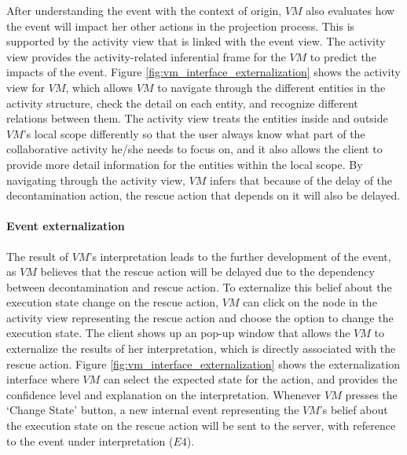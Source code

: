 After understanding the event with the context of origin, $VM$ also evaluates how the event will impact her other actions in the projection process. This is supported by the activity view that is linked with the event view. The activity view provides the activity-related inferential frame for the $VM$ to predict the impacts of the event. Figure \ref{fig:vm_interface_externalization} shows the activity view for $VM$, which allows $VM$ to navigate through the different entities in the activity structure, check the detail on each entity, and recognize different relations between them. The activity view treats the entities inside and outside $VM$'s local scope differently so that the user always know what part of the collaborative activity he/she needs to focus on, and it also allows the client to provide more detail information for the entities within the local scope. By navigating through the activity view, $VM$ infers that because of the delay of the decontamination action, the rescue action that depends on it will also be delayed. 

\paragraph*{Event externalization} %
\label{par:event_externalization}
The result of $VM$'s interpretation leads to the further development of the event, as $VM$ believes that the rescue action will be delayed due to the dependency between decontamination and rescue action. To externalize this belief about the execution state change on the rescue action, $VM$ can click on the node in the activity view representing the rescue action and choose the option to change the execution state. The client shows up an pop-up window that allows the $VM$ to externalize the results of her interpretation, which is directly associated with the rescue action. Figure \ref{fig:vm_interface_externalization} shows the externalization interface where $VM$ can select the expected state for the action, and provides the confidence level and explanation on the interpretation. Whenever $VM$ presses the `Change State' button, a new internal event representing the $VM$'s belief about the execution state on the rescue action will be sent to the server, with reference to the event under interpretation ($E4$).

